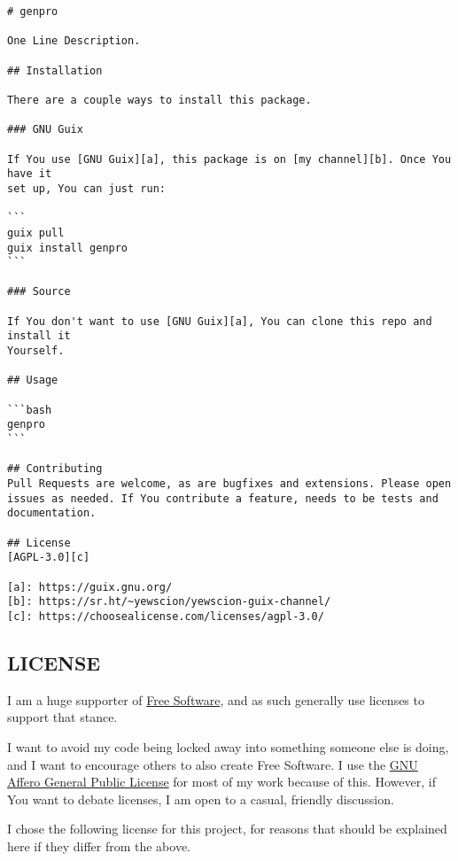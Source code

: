 \documentclass[11pt]{article}
\begin{document}
\begin{verbatim}
# genpro

One Line Description.

## Installation

There are a couple ways to install this package.

### GNU Guix

If You use [GNU Guix][a], this package is on [my channel][b]. Once You have it
set up, You can just run:

```
guix pull
guix install genpro
```

### Source

If You don't want to use [GNU Guix][a], You can clone this repo and install it
Yourself.

## Usage

```bash
genpro
```

## Contributing
Pull Requests are welcome, as are bugfixes and extensions. Please open
issues as needed. If You contribute a feature, needs to be tests and
documentation.

## License
[AGPL-3.0][c]

[a]: https://guix.gnu.org/
[b]: https://sr.ht/~yewscion/yewscion-guix-channel/
[c]: https://choosealicense.com/licenses/agpl-3.0/
\end{verbatim}

\subsection{LICENSE}
\label{sec:org7c75f88}
I am a huge supporter of \href{https://en.wikipedia.org/wiki/Free\_software}{Free Software}, and as such generally use licenses to
support that stance.

I want to avoid my code being locked away into something someone else is doing,
and I want to encourage others to also create Free Software. I use the \href{https://www.gnu.org/licenses/agpl-3.0.en.html}{GNU
Affero General Public License} for most of my work because of this. However, if
You want to debate licenses, I am open to a casual, friendly discussion.

I chose the following license for this project, for reasons that should be
explained here if they differ from the above.
\end{document}
